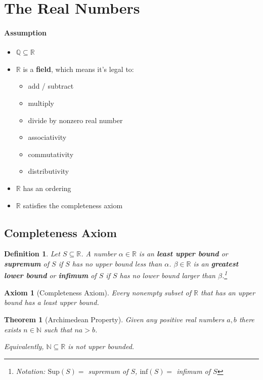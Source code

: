 \documentclass[12pt]{article}
\newtheorem{definition}{Definition}[subsection]
\newtheorem{theorem}{Theorem}[subsection]
\newtheorem{axiom}{Axiom}[subsection]
\begin{document}
	\section{The Real Numbers}
		\paragraph{Assumption} 
		\begin{itemize}
			\item $\mathbb{Q} \subseteq \mathbb{R}$
			\item $\mathbb{R}$ is a \textbf{field}, which means it's legal to:
					\begin{itemize}
						\item add / subtract
						\item multiply
						\item divide by nonzero real number
						\item associativity
						\item commutativity
						\item distributivity  
					\end{itemize}
			\item $\mathbb{R}$ has an ordering
			\item $\mathbb{R}$ satisfies the completeness axiom
		\end{itemize}
		\subsection{Completeness Axiom}
		
		\begin{definition}
			Let $S \subseteq \mathbb{R}$. A number $\alpha \in \mathbb{R}$ is an \textbf{least upper bound} or \textbf{supremum} of $S$ if $S$ has no upper bound less than $\alpha$. $\beta \in \mathbb{R}$ is an \textbf{greatest lower bound} or \textbf{infimum} of $S$ if $S$ has no lower bound larger than $\beta$.\footnote{Notation: $\mathrm{Sup}(S) = $ supremum of $S$, $\mathrm{inf}(S) =$ infimum of $S$}
		\end{definition}
		
		\begin{axiom}[Completeness Axiom]
			Every nonempty subset of $\mathbb{R}$ that has an upper bound has a least upper bound.	
		\end{axiom}
		
		\begin{theorem}[Archimedean Property]
			Given any positive real numbers $a, b$ there exists $n \in \mathbb{N}$ such that $na > b$.
			
			Equivalently, $\mathbb{N} \subseteq \mathbb{R}$ is not upper bounded.
		\end{theorem}
		
\end{document}
